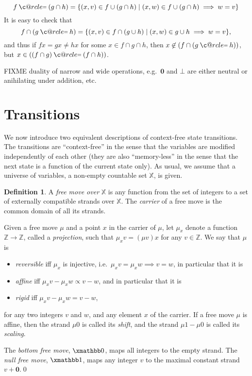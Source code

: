 \documentclass [a4paper,12pt] {article}
\makeatletter
\theoremstyle{definition}
\newtheorem{definition}{Definition}[section]
\newcommand{\domain}{}
\DeclareRobustCommand{\domain}{\mathop{\textstyle\mathsmaller{\bf {Dom}}}}
\newcommand\c@rcle[2]{\mathbin{\ooalign{\hidewidth$#1#2$\hidewidth\crcr$#1\ocircle$}}}
\newcommand{\oeq}{\mathbin{\mathpalette\c@rcle{\raisebox{0.08em}{$\mathsmaller{=}$}}}}
\makeatother
\begin{document}
\[f \oeq (g \cap h) = \{(x, v) \in f \cup (g \cap h) \;|\; (x, w) \in f \cup (g \cap h) \implies w = v\}\]
%
It is easy to check that
%
\[f \cap (g \oeq h) = \{(x, v) \in f \cap (g \cup h) \;|\; (x, w) \in g \cup h \implies w = v\},\]
%
and thus if $fx = gx \neq hx$ for some $x \in \domain{f} \cap
\domain{g} \cap \domain{h}$, then $x \not\in \domain{(f \cap (g \oeq
  h))}$, but $x \in \domain{((f \cap g) \oeq (f \cap h))}$.

FIXME duality of narrow and wide operations, e.g.\ $\bm{0}$ and
$\bm{\bot}$ are either neutral or anihilating under addition, etc.

\section {Transitions}

We now introduce two equivalent descriptions of context-free state
transitions.  The transitions are ``context-free'' in the sense that
the variables are modified independently of each other (they are also
``memory-less'' in the sense that the next state is a function of the
current state only).  As usual, we assume that a universe of
variables, a non-empty countable set ${\mathbb X}$, is given.

\begin {definition}\label{def-free-move}
  A {\em free move over}\/ ${\mathbb X}$ is any function from the set
  of integers to a set of externally compatible strands over ${\mathbb
    X}$.  The {\em carrier}\/ of a free move is the common domain of
  all its strands.

  Given a free move $\mu$ and a point $x$ in the carrier of $\mu$, let
  $\mu_x$ denote a function ${\mathbb Z} \rightarrow {\mathbb Z}$,
  called a {\em projection}\/, such that $\mu_x v = (\mu v) x$ for any
  $v \in {\mathbb Z}$.  We say that $\mu$ is
  \begin {itemize}
  \item {\em reversible}\/ iff $\mu_x$ is injective, i.e.\ $\mu_x v =
    \mu_x w \implies v = w$, in particular that it is
  \item {\em affine}\/ iff $\mu_x v - \mu_x w \propto v - w$, and in
    particular that it is
  \item {\em rigid}\/ iff $\mu_x v - \mu_x w = v - w$,
  \end {itemize}
  for any two integers $v$ and $w$, and any element $x$ of the
  carrier.  If a free move $\mu$ is affine, then the strand $\mu 0$ is
  called its {\em shift}\/, and the strand $\mu 1 - \mu 0$ is called
  its {\em scaling}\/.

  The {\em bottom free move}\/, ${\xmathbb 0}$, maps all integers to
  the empty strand.  The {\em null free move}\/, ${\xmathbb 1}$, maps
  any integer $v$ to the maximal constant strand $v + \bm{0}$.\qed
\end {definition}
\end{document}
